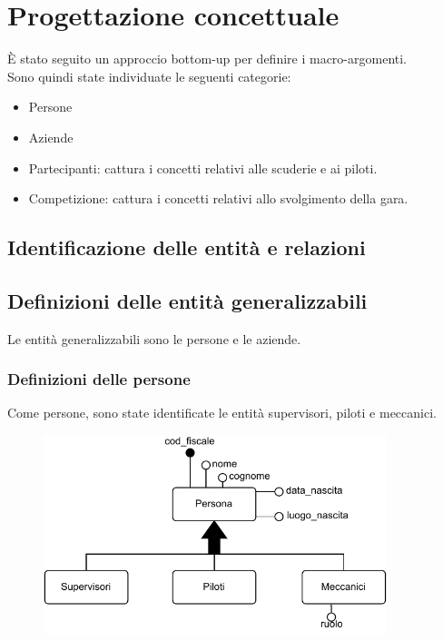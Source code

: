 \documentclass[11pt]{article}
\begin{document}
\section{Progettazione concettuale}
È stato seguito un approccio bottom-up per definire i macro-argomenti.\\
Sono quindi state individuate le seguenti categorie:
\begin{itemize}
    \item Persone
    \item Aziende
    \item Partecipanti: cattura i concetti relativi alle scuderie e ai piloti.
    \item Competizione: cattura i concetti relativi allo svolgimento della gara.
\end{itemize}
\subsection{Identificazione delle entità e relazioni}

\subsection{Definizioni delle entità generalizzabili}
Le entità generalizzabili sono le persone e le aziende.
\subsubsection{Definizioni delle persone}
Come persone, sono state identificate le entità supervisori, piloti e meccanici. 
\begin{figure}[H]
    \centering
    \includegraphics[width=10cm]{../er/gare_persone.pdf}
\end{figure}
\end{document}
